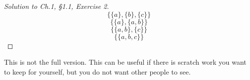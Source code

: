 \documentclass[12pt]{amsart}
\numberwithin{equation}{section}
\theoremstyle{definition}
\theoremstyle{remark}
\newif\ifnotes
\begin{document}
\begin{proof}[Solution to Ch.1, \S 1.1,  Exercise 2] 
$$ \{ \{ a \}, \{ b \}, \{ c \} \} $$
$$ \{ \{ a \}, \{ a, b \} \} $$
$$ \{ \{ a, b \}, \{ c \} \} $$
$$ \{ \{ a, b, c \} \} $$
\end{proof}





\ifnotes


\else
	This is not the full version.  This can be useful if there is scratch work you want to keep for yourself, but you do not want other people to see. 
\fi





\end{document}
